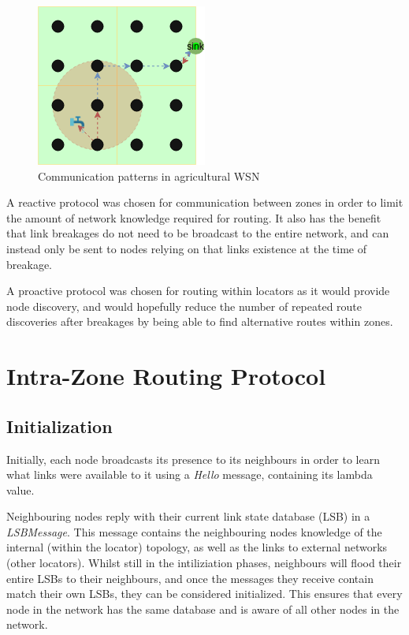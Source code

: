\documentclass[12pt]{article}
\begin{document}
\begin{figure}[!ht]
	\centering
	\includegraphics[width=0.5\linewidth]{images/actuate}
	\caption{Communication patterns in agricultural WSN}
	\label{fig:actuate}
\end{figure}

A reactive protocol was chosen for communication between zones in order to limit the amount of network knowledge required for routing. It also has the benefit that link breakages do not need to be broadcast to the entire network, and can instead only be sent to nodes relying on that links existence at the time of breakage.

A proactive protocol was chosen for routing within locators as it would provide node discovery, and would hopefully reduce the number of repeated route discoveries after breakages by being able to find alternative routes within zones.

\section{Intra-Zone Routing Protocol}

\subsection{Initialization}

Initially, each node broadcasts its presence to its neighbours in order to learn what links were available to it using a \emph{Hello} message, containing its lambda value. 

Neighbouring nodes reply with their current link state database (LSB) in a \emph{LSBMessage}. This message contains the neighbouring nodes knowledge of the internal (within the locator) topology, as well as the links to external networks (other locators). Whilst still in the intiliziation phases, neighbours will flood their entire LSBs to their neighbours, and once the messages they receive contain match their own LSBs, they can be considered initialized. This ensures that every node in the network has the same database and is aware of all other nodes in the network.
\end{document}
